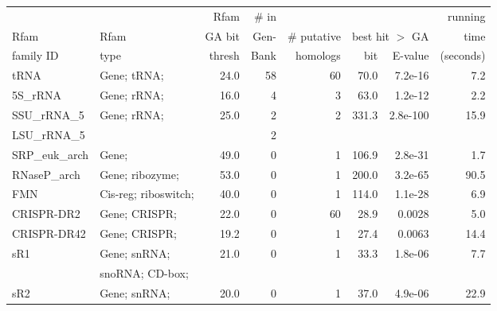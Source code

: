 \begin{small}
\begin{table}
\label{tbl:results}
\begin{center}
\begin{tabular}{|l|l|r|r|r|rr|r|} \hline
                                &                      & Rfam    & \# in   & \multicolumn{3}{c|}{} & running \\ \cline{5-7}
Rfam                            & Rfam                 & GA bit  & Gen-    & {\# putative} & \multicolumn{2}{c|}{best hit $>$ GA} & time \\ \cline{5-7}
family ID                       & type                 & thresh  & Bank    & homologs      & bit & E-value & (seconds) \\ \hline
tRNA                            &  Gene; tRNA;           &  24.0  &    58  &     60 &   70.0  &  7.2e-16 &   7.2 \\
5S\_rRNA                        &  Gene; rRNA;           &  16.0  &     4  &      3 &   63.0  &  1.2e-12 &   2.2 \\
SSU\_rRNA\_5                    &  Gene; rRNA;           &  25.0  &     2  &      2 &  331.3  & 2.8e-100 &  15.9 \\
LSU\_rRNA\_5                    &                        &        &     2  &        &         &          &       \\
SRP\_euk\_arch                  &  Gene;                 &  49.0  &     0  &      1 &  106.9  &  2.8e-31 &   1.7 \\
RNaseP\_arch                    &  Gene; ribozyme;       &  53.0  &     0  &      1 &  200.0  &  3.2e-65 &  90.5 \\
FMN                             &  Cis-reg; riboswitch;  &  40.0  &     0  &      1 &  114.0  &  1.1e-28 &   6.9 \\
CRISPR-DR2                      &  Gene; CRISPR;         &  22.0  &     0  &     60 &   28.9  &   0.0028 &   5.0 \\
CRISPR-DR42                     &  Gene; CRISPR;         &  19.2  &     0  &      1 &   27.4  &   0.0063 &  14.4 \\
sR1                             &  Gene; snRNA;          &  21.0  &     0  &      1 &   33.3  &  1.8e-06 &   7.7 \\
                                &  snoRNA; CD-box;       &        &        &        &         &          &       \\
sR2                             &  Gene; snRNA;          &  20.0  &     0  &      1 &   37.0  &  4.9e-06 &  22.9 \\

\end{tabular}
\end{center}
\end{table}
\end{small}
